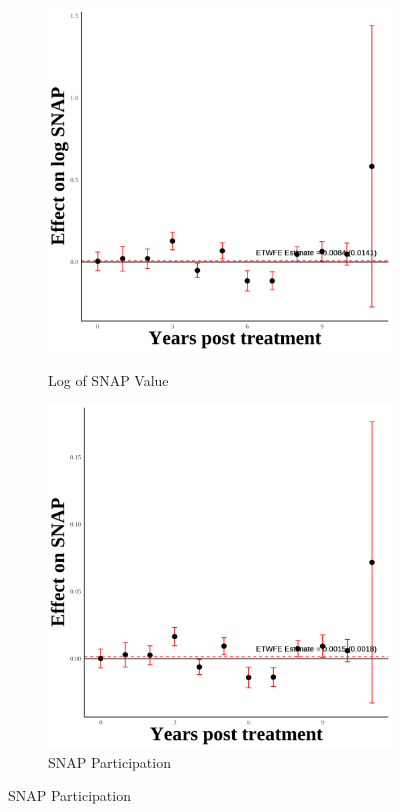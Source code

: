 \documentclass[12pt,english]{article}
\begin{document}
\begin{figure}[H]
  \vspace{0.3cm} %

  \begin{subfigure}[b]{0.3\textwidth}
    \centering
    \caption{Log of SNAP Value}
    \includegraphics[width=\linewidth]{figures/plot68-ln_snap_event_study-third-two.png}
    \label{fig:ln-snap-third-two}
  \end{subfigure}
  \hfill
  \begin{subfigure}[b]{0.3\textwidth}
    \centering
    \caption{SNAP Participation}
    \includegraphics[width=\linewidth]{figures/plot69-snap_event_study-third-two.png}

\end{subfigure}
\end{figure}
\end{document}
